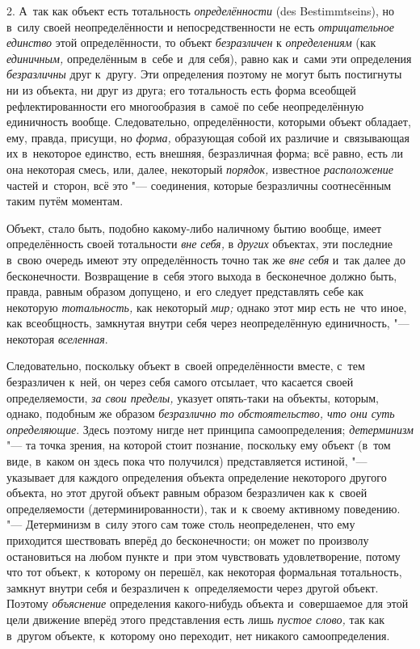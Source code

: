 2. А~так как объект есть тотальность {\em определённости} (des
Bestim\-mtseins), но в~силу своей неопределённости и
непосредственности не есть {\em отрицательное единство}
этой определённости, то объект {\em безразличен} к
{\em определениям} (как {\em единичным,}
определённым в~себе и~для себя), равно как и~сами эти
определения {\em безразличны}
друг к~другу. Эти определения поэтому не могут быть
постигнуты ни из объекта, ни друг из друга; его тотальность есть форма
всеобщей рефлектированности его многообразия в~самоё по себе неопределённую
единичность вообще. Следовательно, определённости, которыми объект
обладает, ему, правда, присущи, но {\em форма,} образующая
собой их различие и~связывающая их в~некоторое единство, есть внешняя,
безразличная форма; всё равно, есть ли она некоторая смесь, или, далее,
некоторый {\em порядок,} известное
{\em расположение} частей
и~сторон, всё это "--- соединения, которые безразличны
соотнесённым таким путём моментам.

Объект, стало быть, подобно какому-либо наличному бытию
вообще, имеет определённость своей тотальности
{\em вне себя,} в {\em других} объектах,
эти последние в~свою очередь имеют эту определённость точно так же
{\em вне себя} и~так
далее до бесконечности. Возвращение в~себя этого выхода в~бесконечное
должно быть, правда, равным образом допущено, и~его следует представлять
себе как некоторую {\em тотальность,} как некоторый {\em мир;}
однако этот мир есть не~что иное, как всеобщность, замкнутая
внутри себя через неопределённую единичность, "--- некоторая {\em вселенная}.

Следовательно, поскольку объект в~своей определённости вместе,
с~тем безразличен к~ней, он через себя самого отсылает, что касается своей
определяемости, {\em за свои пределы,}
указует опять-таки на объекты, которым, однако, подобным же
образом {\em безразлично то
обстоятельство, что они суть определяющие}. Здесь поэтому
нигде нет принципа самоопределения;
{\em детерминизм} "--- та
точка зрения, на которой стоит познание, поскольку ему объект (в~том виде,
в~каком он здесь пока что получился) представляется истиной, "---
указывает для каждого определения объекта определение
некоторого другого объекта, но этот другой объект равным образом
безразличен как к~своей определяемости (детерминированности), так и~к
своему активному поведению. "--- Детерминизм в~силу этого сам
тоже столь неопределенен, что ему приходится шествовать вперёд до
бесконечности; он может по произволу остановиться на любом пункте и~при
этом чувствовать удовлетворение, потому что тот объект, к~которому он
перешёл, как некоторая формальная тотальность, замкнут внутри себя и
безразличен к~определяемости через другой объект. Поэтому {\em объяснение}
определения какого-нибудь объекта и~совершаемое для этой цели
движение вперёд этого представления есть лишь {\em пустое слово,} так
как в~другом объекте, к~которому оно переходит, нет никакого самоопределения.

